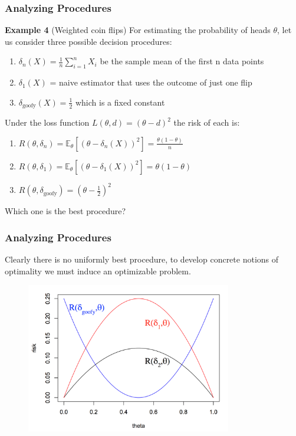 \documentclass[10pt]{beamer}
\begin{document}
\begin{frame}
\frametitle{Analyzing Procedures}
\textbf{Example 4} (Weighted coin flips)
\newline
\newline
For estimating the probability of heads $\theta$, let us consider three possible decision procedures:

\begin{enumerate}
\item{$\delta_{n}(X) = \frac{1}{n} \sum_{i=1}^n X_i$ be the sample mean of the first n data points}

\item{$\delta_1(X)$ = naive estimator that uses the outcome of just one flip}

\item{$\delta_{\text{goofy}}(X) = \frac{1}{2}$ which is a fixed constant}	

\end{enumerate}

\vspace{10pt}
Under the loss function $L(\theta, d) = (\theta - d)^2$ the risk of each is:

\begin{enumerate}

\item{$R(\theta, \delta_n) = \mathbb{E}_{\theta}[(\theta - \delta_n(X))^2] = \frac{\theta(1-\theta)}{n}$}

\item{$R(\theta, \delta_1) = \mathbb{E}_{\theta}[(\theta - \delta_1(X))^2] = \theta(1-\theta)$}

\item{$R(\theta, \delta_{\text{goofy}}) = (\theta - \frac{1}{2})^2$}

\end{enumerate}
\vspace{10pt}
Which one is the best procedure?
\end{frame}

\begin{frame}
\frametitle{Analyzing Procedures}
Clearly there is no uniformly best procedure, to develop concrete notions of optimality we must induce an optimizable problem.
\begin{figure}
	\includegraphics[width=0.8\textwidth]{risk.png}
\end{figure}
\end{frame}
\end{document}
